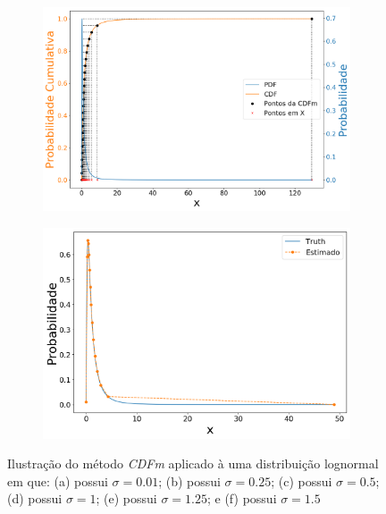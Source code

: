 \begin{figure}[H]
	\begin{subfigure}[b]{0.49\textwidth}
		\centering 
		\includegraphics[width=\textwidth]{./figuras/CDFm_lognormal_125}
		\caption{}
		\label{fig:log125}
	\end{subfigure}
	\hfill
	\begin{subfigure}[b]{0.49\textwidth}
		\centering 
		\includegraphics[width=\textwidth]{./figuras/CDFm_lognormal_15}
		\caption{}
		\label{fig:log150}
	\end{subfigure}
	\caption{Ilustração do método \textit{CDFm} aplicado à uma distribuição lognormal em que: (a) possui $\sigma = 0.01$; (b) possui $\sigma = 0.25$; (c) possui $\sigma = 0.5$; (d) possui $\sigma = 1$; (e) possui $\sigma = 1.25$; e (f) possui $\sigma = 1.5$}
	\label{fig:Lognormal_cdf}
\end{figure}

